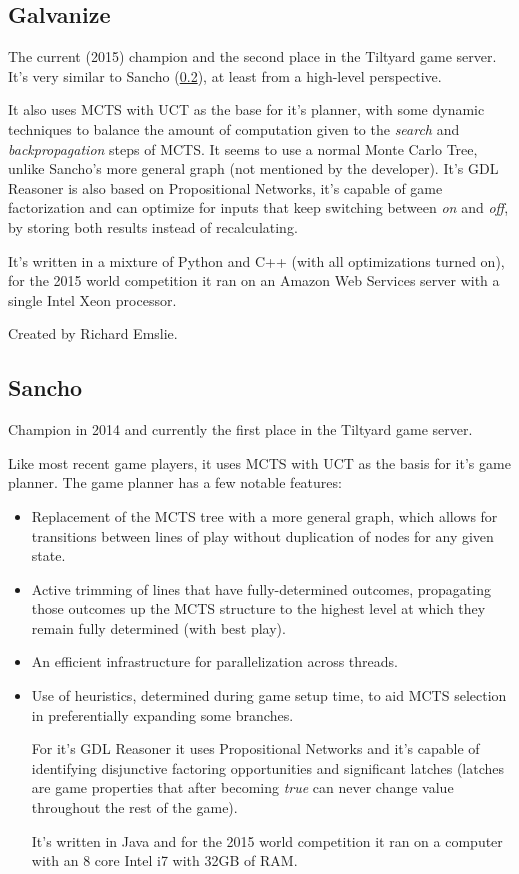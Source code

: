 \subsection{Galvanize}
The current (2015) champion and the second place in the Tiltyard game server.
It's very similar to Sancho (\ref{ssc:Sancho}), at least from a high-level perspective. 

It also uses \gls{MCTS} with \gls{UCT} as the base for it's planner, with some dynamic techniques to balance the amount of computation given to the \textit{search} and \textit{backpropagation} steps of \gls{MCTS}. It seems to use a normal Monte Carlo Tree, unlike Sancho's more general graph (not mentioned by the developer). 
It's GDL Reasoner is also based on Propositional Networks, it's capable of game factorization and can optimize for inputs that keep switching between \textit{on} and \textit{off}, by storing both results instead of recalculating.

It's written in a mixture of Python and C++ (with all optimizations turned on), for the 2015 world competition it ran on an Amazon Web Services server with a single Intel Xeon processor. 

Created by Richard Emslie.


\subsection{Sancho}
\label{ssc:Sancho}
Champion in 2014 and currently the first place in the Tiltyard game server.

Like most recent game players, it uses \gls{MCTS} with \gls{UCT} as the  basis for it's game planner. The game planner has a few notable features: 

\begin{itemize}

\item Replacement of the MCTS tree with a more general graph, which allows for transitions between lines of play without duplication of nodes for any given state.

\item Active trimming of lines that have fully-determined outcomes, propagating those outcomes up the MCTS structure to the highest level at which they remain fully determined (with best play).

\item An efficient infrastructure for parallelization across threads.

\item Use of heuristics, determined during game setup time, to aid \gls{MCTS} selection in preferentially expanding some branches.

For it's \gls{GDL} Reasoner it uses Propositional Networks and it's capable of identifying disjunctive factoring opportunities and significant latches (latches are game properties that after becoming \textit{true} can never change value throughout the rest of the game).

It's written in Java and for the 2015 world competition it ran on a computer with an 8 core Intel i7 with 32GB of RAM.

\end{itemize}

